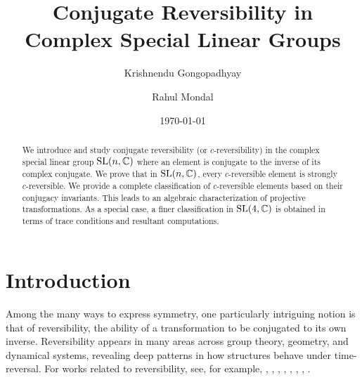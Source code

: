 \documentclass[11pt]{amsart}
\numberwithin{equation}{section}
\theoremstyle{plain}
\theoremstyle{definition}
\newcommand{\C}{\mathbb{C}}
\numberwithin{equation}{section}
\def \SL{ {\rm SL}}
\begin{document}
	\title[$c$-Reversibility in $\SL(n, \C)$] {Conjugate Reversibility in  Complex Special Linear Groups}
	\author[K. Gongopadhyay and R. Mondal] { Krishnendu Gongopadhyay \and Rahul Mondal}

\address{Indian Institute of Science Education and Research (IISER) Mohali,
		Knowledge City,  Sector 81, S.A.S. Nagar 140306, Punjab, India}
	
	
	\address{Indian Institute of Science Education and Research (IISER) Mohali,
		Knowledge City,  Sector 81, S.A.S. Nagar 140306, Punjab, India}
	
	
\makeatletter
{}
\makeatother


    
    \date{\today}


      \begin{abstract}
        We introduce and study conjugate reversibility (or $c$-reversibility) in the complex special linear group $\SL(n,\C)$  where an element is conjugate to the inverse of its complex conjugate. We prove that in $\SL(n, \C)$, every $c$-reversible element is strongly $c$-reversible. We provide a complete classification of $c$-reversible elements based on their conjugacy invariants.  This leads to an algebraic characterization of projective transformations. As a special case, a finer classification in $\SL(4, \C)$ is obtained in terms of trace conditions and resultant computations. 
    \end{abstract}
  	\maketitle

	\section{Introduction}\label{sec:intro}
    	Among the many ways to express symmetry, one particularly intriguing notion is that of reversibility, the ability of a transformation to be conjugated to its own inverse. Reversibility appears in many areas across group theory, geometry, and dynamical systems, revealing deep patterns in how structures behave under time-reversal. For works related to reversibility, see, for example, \cite{BR}, \cite{dhs},  \cite{Dj}, \cite{El}, \cite{GM},  \cite{OS}, \cite{sho}, \cite{st}.
    
\end{document}
